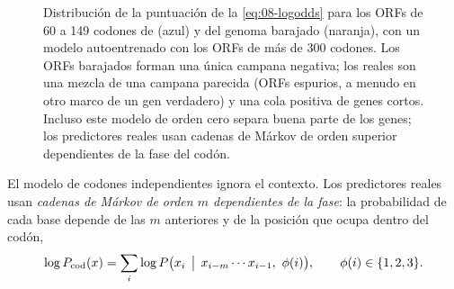 \begin{figure}[t]
\centering
{}
\caption[Puntuación de codones de ORFs cortos]{Distribución de la puntuación de la \cref{eq:08-logodds} para los ORFs de 60 a 149 codones de  (azul) y del genoma barajado (naranja), con un modelo autoentrenado con los ORFs de más de 300 codones. Los ORFs barajados forman una única campana negativa; los reales son una mezcla de una campana parecida (ORFs espurios, a menudo en otro marco de un gen verdadero) y una cola positiva de genes cortos. Incluso este modelo de orden cero separa buena parte de los genes; los predictores reales usan cadenas de Márkov de orden superior dependientes de la fase del codón.}
\label{fig:08-puntuacion}
\end{figure}

El modelo de codones independientes ignora el contexto. Los predictores reales usan \emph{cadenas de Márkov de orden $m$ dependientes de la fase}: la probabilidad de cada base depende de las $m$ anteriores y de la posición que ocupa dentro del codón,
\begin{equation}\label{eq:08-markov}
\log P_{\text{cod}}(x) = \sum_{i}\log P\bigl(x_i \,\bigm|\, x_{i-m}\cdots x_{i-1},\ \phi(i)\bigr),
\qquad \phi(i)\in\{1,2,3\}.
\end{equation}

\begin{simbolos}
\end{simbolos}

